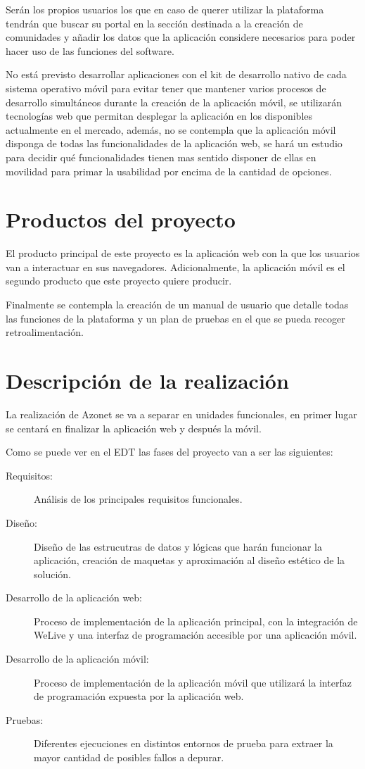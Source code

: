 \documentclass{DeustoFDP}
\begin{document}
Serán los propios usuarios los que en caso de querer utilizar la plataforma tendrán que buscar su portal en la sección destinada a la creación de comunidades y añadir los datos que la aplicación considere necesarios para poder hacer uso de las funciones del software.

No está previsto desarrollar aplicaciones con el kit de desarrollo nativo de cada sistema operativo móvil para evitar tener que mantener varios procesos de desarrollo simultáneos durante la creación de la aplicación móvil, se utilizarán tecnologías web que permitan desplegar la aplicación en los disponibles actualmente en el mercado, además, no se contempla que la aplicación móvil disponga de todas las funcionalidades de la aplicación web, se hará un estudio para decidir qué funcionalidades tienen mas sentido disponer de ellas en movilidad para primar la usabilidad por encima de la cantidad de opciones.

\section{Productos del proyecto}
El producto principal de este proyecto es la aplicación web con la que los usuarios van a interactuar en sus navegadores. Adicionalmente, la aplicación móvil es el segundo producto que este proyecto quiere producir.

Finalmente se contempla la creación de un manual de usuario que detalle todas las funciones de la plataforma y un plan de pruebas en el que se pueda recoger retroalimentación.

\section{Descripción de la realización}
La realización de Azonet se va a separar en unidades funcionales, en primer lugar se centará en finalizar la aplicación web y después la móvil.

Como se puede ver en el EDT las fases del proyecto van a ser las siguientes:
\begin{description}
  \item[Requisitos:] Análisis de los principales requisitos funcionales.
  \item[Diseño:] Diseño de las estrucutras de datos y lógicas que harán funcionar la aplicación, creación de maquetas y aproximación al diseño estético de la solución.
  \item[Desarrollo de la aplicación web:] Proceso de implementación de la aplicación principal, con la integración de WeLive y una interfaz de programación accesible por una aplicación móvil.
  \item[Desarrollo de la aplicación móvil:] Proceso de implementación de la aplicación móvil que utilizará la interfaz de programación expuesta por la aplicación web.
  \item[Pruebas:] Diferentes ejecuciones en distintos entornos de prueba para extraer la mayor cantidad de posibles fallos a depurar.
\end{description}
\end{document}
